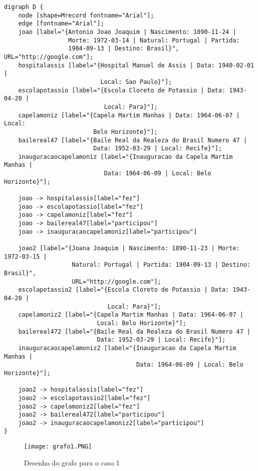 \documentclass[a4paper]{article}
\begin{document}
\lstset{language=tex}
\begin{lstlisting}
digraph D {
    node [shape=Mrecord fontname="Arial"];
    edge [fontname="Arial"];
    joao [label="{Antonio Joao Joaquim | Nascimento: 1890-11-24 | 
                  Morte: 1972-03-14 | Natural: Portugal | Partida: 
                  1904-09-13 | Destino: Brasil}", URL="http://google.com"];
    hospitalassis [label="{Hospital Manuel de Assis | Data: 1940-02-01 | 
                           Local: Sao Paulo}"];
    escolapotassio [label="{Escola Cloreto de Potassio | Data: 1943-04-20 | 
                            Local: Para}"];
    capelamoniz [label="{Capela Martim Manhas | Data: 1964-06-07 | Local: 
                         Belo Horizonte}"];
    bailereal47 [label="{Baile Real da Realeza do Brasil Numero 47 | 
                         Data: 1952-03-29 | Local: Recife}"];
    inauguracaocapelamoniz [label="{Inauguracao da Capela Martim Manhas | 
                            Data: 1964-06-09 | Local: Belo Horizonte}"];

    joao -> hospitalassis[label="fez"]
    joao -> escolapotassio[label="fez"]
    joao -> capelamoniz[label="fez"]
    joao -> bailereal47[label="participou"]
    joao -> inauguracaocapelamoniz[label="participou"]

    joao2 [label="{Joana Joaquim | Nascimento: 1890-11-23 | Morte: 1972-03-15 |
                   Natural: Portugal | Partida: 1904-09-13 | Destino: Brasil}",
                   URL="http://google.com"];
    escolapotassio2 [label="{Escola Cloreto de Potassio | Data: 1943-04-20 |
                             Local: Para}"];
    capelamoniz2 [label="{Capela Martim Manhas | Data: 1964-06-07 | 
                          Local: Belo Horizonte}"];
    bailereal472 [label="{Baile Real da Realeza do Brasil Numero 47 | 
                          Data: 1952-03-29 | Local: Recife}"];
    inauguracaocapelamoniz2 [label="{Inauguracao da Capela Martim Manhas | 
                                     Data: 1964-06-09 | Local: Belo Horizonte}"];

    joao2 -> hospitalassis[label="fez"]
    joao2 -> escolapotassio2[label="fez"]
    joao2 -> capelamoniz2[label="fez"]
    joao2 -> bailereal472[label="participou"]
    joao2 -> inauguracaocapelamoniz2[label="participou"]
}

\end{lstlisting}


\begin{sidewaysfigure}
\centering
\texttt{[image: grafo1.PNG]}
\caption{Desenho do grafo para o caso 1}
\end{sidewaysfigure}
\end{document}
